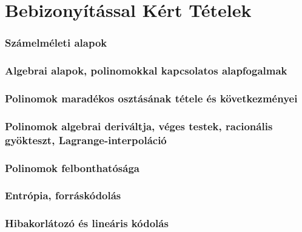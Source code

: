 \documentclass[10pt,a4paper]{article}
\renewcommand{\>}{\rightarrow}
\begin{document}
\part{Bebizonyítással Kért Tételek}

\section{Számelméleti alapok}
\newpage

\section{Algebrai alapok, polinomokkal kapcsolatos alapfogalmak}
\newpage

\section{Polinomok maradékos osztásának tétele és következményei}
\newpage

\section{Polinomok algebrai deriváltja, véges testek, racionális gyökteszt, Lagrange-interpoláció}
\newpage

\section{Polinomok felbonthatósága}
\newpage

\section{Entrópia, forráskódolás}
\newpage

\section{Hibakorlátozó és lineáris kódolás}
\newpage
\end{document}
